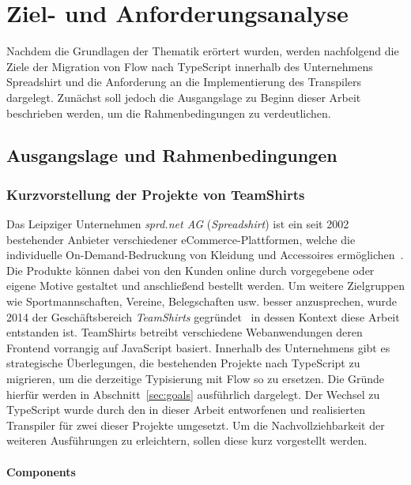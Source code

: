 \chapter{Ziel- und Anforderungsanalyse}
\label{chap:analysis}

Nachdem die Grundlagen der Thematik erörtert wurden, werden nachfolgend die Ziele der Migration von Flow nach TypeScript innerhalb des Unternehmens Spreadshirt und die Anforderung an die Implementierung des Transpilers dargelegt. Zunächst soll jedoch die Ausgangslage zu Beginn dieser Arbeit beschrieben werden, um die Rahmenbedingungen zu verdeutlichen.

\section{Ausgangslage und Rahmenbedingungen}
\label{sec:status-quo}

\subsection{Kurzvorstellung der Projekte von TeamShirts}
\label{sec:teamshirts-projects}

Das Leipziger Unternehmen \textit{sprd.net AG} (\textit{Spreadshirt}) ist ein seit 2002 bestehender Anbieter verschiedener eCommerce-Plattformen, welche die individuelle On-Demand-Bedruckung von Kleidung und Accessoires ermöglichen~\autocite{SPREADSHIRT:ABOUT}. Die Produkte können dabei von den Kunden online durch vorgegebene oder eigene Motive gestaltet und anschließend bestellt werden. Um weitere Zielgruppen wie Sportmannschaften, Vereine, Belegschaften usw. besser anzusprechen, wurde 2014 der Geschäftsbereich \textit{TeamShirts} gegründet~\autocite{TEAMSHIRTS:ABOUT} in dessen Kontext diese Arbeit entstanden ist. TeamShirts betreibt verschiedene Webanwendungen deren Frontend vorrangig auf JavaScript basiert. Innerhalb des Unternehmens gibt es strategische Überlegungen, die bestehenden Projekte nach TypeScript zu migrieren, um die derzeitige Typisierung mit Flow so zu ersetzen. Die Gründe hierfür werden in Abschnitt~\ref{sec:goals} ausführlich dargelegt. Der Wechsel zu TypeScript wurde durch den in dieser Arbeit entworfenen und realisierten Transpiler für zwei dieser Projekte umgesetzt. Um die Nachvollziehbarkeit der weiteren Ausführungen zu erleichtern, sollen diese kurz vorgestellt werden.

\subsubsection{Components}

